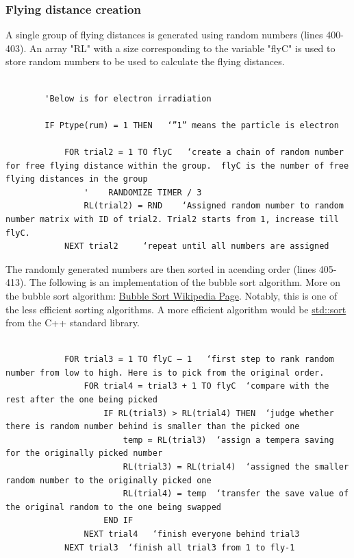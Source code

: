 \documentclass[10pt, reqno]{exam}
\begin{document}
\subsubsection{Flying distance creation}
\label{sec:flying distance creation}

A single group of flying distances is generated using random numbers (lines 400-403). An array "RL" with a size corresponding to the variable "flyC" is used to store random numbers to be used to calculate the flying distances. \par

\begin{verbatim}
    
        'Below is for electron irradiation
    
        IF Ptype(rum) = 1 THEN   ‘”1” means the particle is electron
    
            FOR trial2 = 1 TO flyC   ‘create a chain of random number for free flying distance within the group.  flyC is the number of free flying distances in the group
                '    RANDOMIZE TIMER / 3   
                RL(trial2) = RND    ‘Assigned random number to random number matrix with ID of trial2. Trial2 starts from 1, increase till flyC. 
            NEXT trial2     ‘repeat until all numbers are assigned
\end{verbatim}

The randomly generated numbers are then sorted in acending order (lines 405-413). The following is an implementation of the bubble sort algorithm. More on the bubble sort algorithm: \href{https://en.wikipedia.org/wiki/Bubble_sort}{Bubble Sort Wikipedia Page}. Notably, this is one of the less efficient sorting algorithms. A more efficient algorithm would be \href{https://en.cppreference.com/w/cpp/algorithm/sort}{std::sort} from the C++ standard library. \par 

\begin{verbatim}

            FOR trial3 = 1 TO flyC – 1   ‘first step to rank random number from low to high. Here is to pick from the original order.
                FOR trial4 = trial3 + 1 TO flyC  ‘compare with the rest after the one being picked 
                    IF RL(trial3) > RL(trial4) THEN  ‘judge whether there is random number behind is smaller than the picked one
                        temp = RL(trial3)  ‘assign a tempera saving for the originally picked number
                        RL(trial3) = RL(trial4)  ‘assigned the smaller random number to the originally picked one
                        RL(trial4) = temp  ‘transfer the save value of the original random to the one being swapped
                    END IF
                NEXT trial4   ‘finish everyone behind trial3
            NEXT trial3  ‘finish all trial3 from 1 to fly-1
\end{verbatim}
\end{document}
